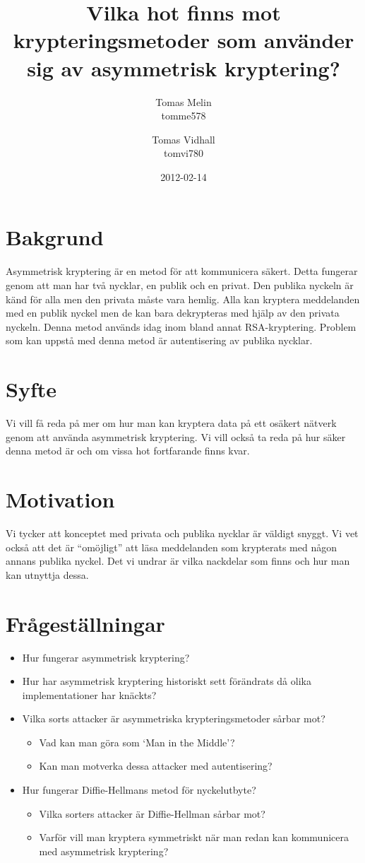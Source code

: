 \documentclass{article}
\title{Vilka hot finns mot krypteringsmetoder som använder sig av asymmetrisk kryptering?}
\author{
Tomas Melin \\ tomme578 \and
Tomas Vidhall \\ tomvi780
}
\date{2012-02-14}
\begin{document}
\maketitle

\section*{Bakgrund}
Asymmetrisk kryptering är en metod för att kommunicera säkert. Detta fungerar genom att man har två nycklar, en publik och en privat. 
Den publika nyckeln är känd för alla men den privata måste vara hemlig. Alla kan kryptera meddelanden med en publik nyckel men de kan bara dekrypteras med hjälp av den privata nyckeln. Denna metod används idag inom bland annat RSA-kryptering. Problem som kan uppstå med denna metod är autentisering av publika nycklar. 

\section*{Syfte}
Vi vill få reda på mer om hur man kan kryptera data på ett osäkert nätverk genom att använda asymmetrisk kryptering. Vi vill också ta reda på hur säker denna metod är och om vissa hot fortfarande finns kvar. 

\section*{Motivation}
Vi tycker att konceptet med privata och publika nycklar är väldigt snyggt. Vi vet också att det är “omöjligt” att läsa meddelanden som krypterats med någon annans publika nyckel. Det vi undrar är vilka nackdelar som finns och hur man kan utnyttja dessa.  

\pagebreak

\section*{Frågeställningar}
\begin{itemize}
    \item Hur fungerar asymmetrisk kryptering?
    \item Hur har asymmetrisk kryptering historiskt sett förändrats då olika implementationer har knäckts?
    \item Vilka sorts attacker är asymmetriska krypteringsmetoder sårbar mot?
    \begin{itemize} 
        \item Vad kan man göra som ‘Man in the Middle’?
        \item Kan man motverka dessa attacker med autentisering?
    \end{itemize}
    
    \item Hur fungerar Diffie-Hellmans metod för nyckelutbyte?
     \begin{itemize}
        \item Vilka sorters attacker är Diffie-Hellman sårbar mot?
        \item Varför vill man kryptera symmetriskt när man redan kan kommunicera med asymmetrisk kryptering? 
    \end{itemize}
\end{itemize}
\end{document}
